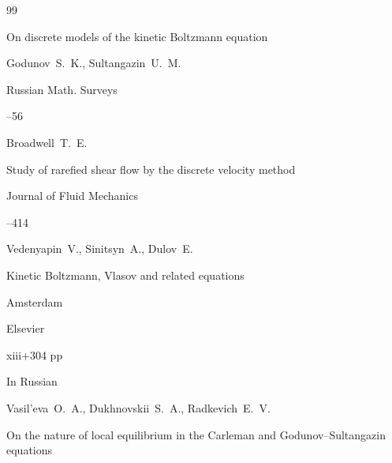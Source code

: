 \begin{thebibliography}{99}




\paper On discrete models of the kinetic Boltzmann equation

\by Godunov~S.~K., Sultangazin~U.~M.



\jour Russian Math. Surveys




--56







\by Broadwell~T.~E.

\paper Study of rarefied shear flow by the discrete velocity method

\jour  Journal of Fluid Mechanics




--414





\by Vedenyapin~V., Sinitsyn~A., Dulov~E.

\book Kinetic Boltzmann, Vlasov and related equations


\publaddr Amsterdam

\publ Elsevier 

\totalpages xiii+304 pp \nofrills






\lang In Russian

\by Vasil'eva~O.~A., Dukhnovskii~S.~A., Radkevich~E.~V.

\paper On the nature of local equilibrium in the Carleman and Godunov--Sultangazin equations


\end{thebibliography}
